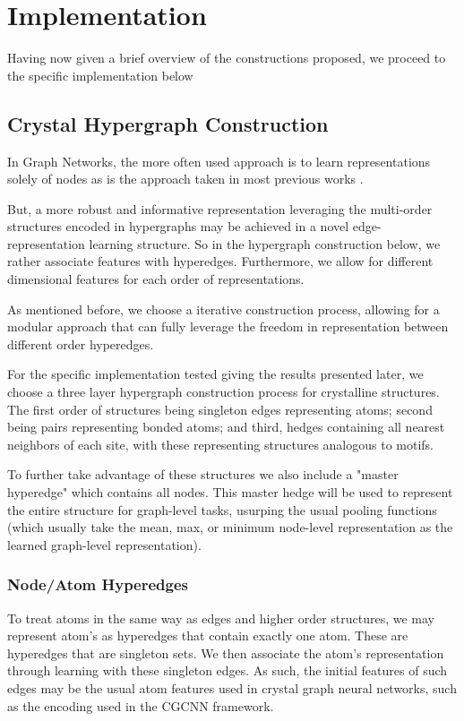 \documentclass{article}
\begin{document}
\section{Implementation}
Having now given a brief overview of the constructions proposed, we proceed to the specific implementation below

\subsection{Crystal Hypergraph Construction}
In Graph Networks, the more often used approach is to learn representations solely of nodes as is the approach taken in most previous works \cite{choudhary2021atomistic, xie2018crystal, banjade2021structure, chen2019graph}. 

But, a more robust and informative representation leveraging the multi-order structures encoded in hypergraphs may be achieved in a novel edge-representation learning structure. So in the hypergraph construction below, we rather associate features with hyperedges. Furthermore, we allow for different dimensional features for each order of representations. 

As mentioned before, we choose a iterative construction process, allowing for a modular approach that can fully leverage the freedom in representation between different order hyperedges.

For the specific implementation tested giving the results presented later, we choose a three layer hypergraph construction process for crystalline structures. The first order of structures being singleton edges representing atoms; second being pairs representing bonded atoms; and third, hedges containing all nearest neighbors of each site, with these representing structures analogous to motifs.

To further take advantage of these structures we also include a "master hyperedge" which contains all nodes. This master hedge will be used to represent the entire structure for graph-level tasks, usurping the usual pooling functions (which usually take the mean, max, or minimum node-level representation as the learned graph-level representation).

\subsubsection{Node/Atom Hyperedges}
To treat atoms in the same way as edges and higher order structures, we may represent atom's as hyperedges that contain exactly one atom. These are hyperedges that are singleton sets. We then associate the atom's representation through learning with these singleton edges. As such, the initial features of such edges may be the usual atom features used in crystal graph neural networks, such as the encoding used in the CGCNN framework.
\end{document}
